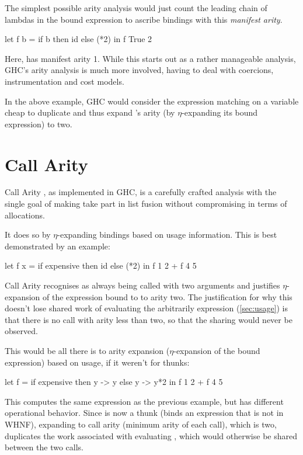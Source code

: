 The simplest possible arity analysis would just count the leading chain of lambdas in the bound expression to ascribe bindings with this \emph{manifest arity}.
\begin{haskellcode}
  let f b = 
        if b
        then id 
        else (*2)
  in f True 2
\end{haskellcode}

Here,  has manifest arity 1.
While this starts out as a rather manageable analysis, GHC's arity analysis is much more involved, having to deal with coercions, instrumentation and cost models.

In the above example, GHC would consider the  expression matching on a variable cheap to duplicate and thus expand 's arity (by $\eta$-expanding its bound expression) to two.

\section{Call Arity}\label{sec:callarity}

Call Arity \parencite{callarity}, as implemented in GHC, is a carefully crafted analysis with the single goal of making  take part in list fusion without compromising in terms of allocations.

It does so by $\eta$-expanding bindings based on usage information.
This is best demonstrated by an example:
\begin{haskellcode}
  let f x = 
        if expensive
        then id 
        else (*2)
  in f 1 2 + f 4 5
\end{haskellcode}

Call Arity recognises  as always being called with two arguments and justifies $\eta$-expansion of the expression bound to  to arity two.
The justification for why this doesn't lose shared work of evaluating the arbitrarily  expression (\cf \cref{sec:usage}) is that there is no call with arity less than two, so that the sharing would never be observed.

This would be all there is to arity expansion (\eg $\eta$-expansion of the bound expression) based on usage, if it weren't for thunks:
\begin{haskellcode}
  let f =
        if expensive
        then \x y -> y
        else \x y -> y*2
  in f 1 2 + f 4 5
\end{haskellcode}

This computes the same expression as the previous example, but has different operational behavior.
Since  is now a thunk (\eg binds an expression that is not in WHNF), expanding  to call arity (minimum arity of each call), which is two, duplicates the work associated with evaluating , which would otherwise be shared between the two calls.

